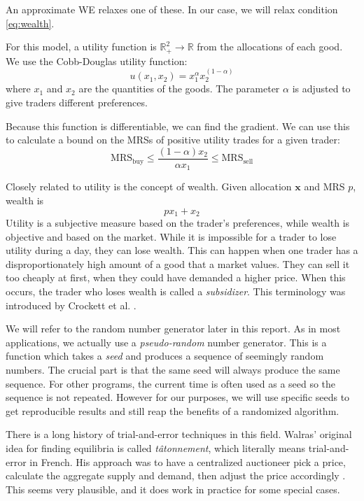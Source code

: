 \documentclass[12pt,a4paper,titlepage]{article}
\begin{document}
An approximate WE relaxes one of these.
In our case, we will relax condition \ref{eq:wealth}.

For this model, a utility function is $\mathbb{R}^2_+ \rightarrow \mathbb{R}$ from the allocations of each good.
We use the Cobb-Douglas utility function:
\[
  u(x_1, x_2) = x_1^{\alpha} x_2^{(1-\alpha)}
\]
where $x_1$ and $x_2$ are the quantities of the goods.
The parameter $\alpha$ is adjusted to give traders different preferences.

Because this function is differentiable, we can find the gradient.
We can use this to calculate a bound on the MRSs of positive utility trades for a given trader:
\[
  \mathrm{MRS_{buy}} \leq \frac{(1-\alpha)x_2}{\alpha x_1} \leq \mathrm{MRS_{sell}}
\]

Closely related to utility is the concept of wealth.
Given allocation $\mathbf{x}$ and MRS $p$, wealth is
\begin{equation}\label{eq:wdef}
  px_1 + x_2 
\end{equation}
Utility is a subjective measure based on the trader's preferences, while wealth is objective and based on the market.
While it is impossible for a trader to lose utility during a day, they can lose wealth.
This can happen when one trader has a disproportionately high amount of a good that a market values.
They can sell it too cheaply at first, when they could have demanded a higher price.
When this occurs, the trader who loses wealth is called a \textit{subsidizer}.
This terminology was introduced by Crockett et al. \cite{crockett}.

We will refer to the random number generator later in this report.
As in most applications, we actually use a \textit{pseudo-random} number generator.
This is a function which takes a \textit{seed} and produces a sequence of seemingly random numbers.
The crucial part is that the same seed will always produce the same sequence.
For other programs, the current time is often used as a seed so the sequence is not repeated.
However for our purposes, we will use specific seeds to get reproducible results and still reap the benefits of a randomized algorithm.

There is a long history of trial-and-error techniques in this field.
Walras' original idea for finding equilibria is called \textit{tâtonnement}, which literally means trial-and-error in French.
His approach was to have a centralized auctioneer pick a price, calculate the aggregate supply and demand, then adjust the price accordingly \cite{walras}.
This seems very plausible, and it does work in practice for some special cases.
\end{document}

